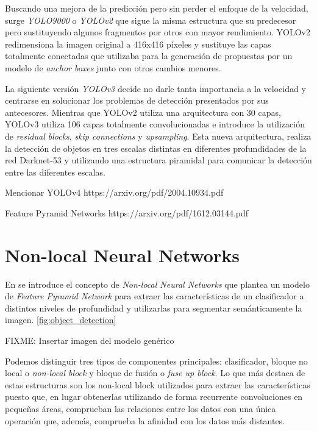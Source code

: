 Buscando una mejora de la predicción pero sin perder el enfoque de la velocidad, surge \emph{YOLO9000} o \emph{YOLOv2} \cite{2016arXiv161208242R} que sigue la misma estructura que su predecesor pero sustituyendo algunos fragmentos por otros con mayor rendimiento. YOLOv2 redimensiona la imagen original a 416x416 píxeles y sustituye las capas totalmente conectadas que utilizaba para la generación de propuestas por un modelo de \emph{anchor boxes} \cite{2015arXiv150601497R} junto con otros cambios menores.\newline

La siguiente versión \emph{YOLOv3} \cite{2018arXiv180402767R} decide  no darle tanta importancia a la velocidad y centrarse en solucionar los problemas de detección presentados por sus antecesores. Mientras que YOLOv2 utiliza una arquitectura con 30 capas, YOLOv3 utiliza 106 capas totalmente convolucionadas e introduce la utilización de \emph{residual blocks}, \emph{skip connections} y \emph{upsampling}. Esta nueva arquitectura, realiza la detección de objetos en tres escalas distintas en diferentes profundidades de la red Darknet-53 y utilizando una estructura piramidal \cite{2016arXiv161203144L} para comunicar la detección entre las diferentes escalas.\newline

Mencionar YOLOv4
https://arxiv.org/pdf/2004.10934.pdf\newline

Feature Pyramid Networks
https://arxiv.org/pdf/1612.03144.pdf

\section{Non-local Neural Networks}

En \cite{DBLP:journals/corr/abs-1711-07971} se introduce el concepto de \emph{Non-local Neural Networks} que plantea un modelo de \emph{Feature Pyramid Network} para extraer las características de un clasificador a distintos niveles de profundidad y utilizarlas para segmentar semánticamente la imagen. \ref{fig:object_detection}\newline

FIXME: Insertar imagen del modelo genérico

Podemos distinguir tres tipos de componentes principales: clasificador, bloque no local o \emph{non-local block} y bloque de fusión o \emph{fuse up block}. Lo que más destaca de estas estructuras son los non-local block utilizados para extraer las características puesto que, en lugar obtenerlas utilizando de forma recurrente convoluciones en pequeñas áreas, comprueban las relaciones entre los datos con una única operación que, además, comprueba la afinidad con los datos más distantes.\newline

